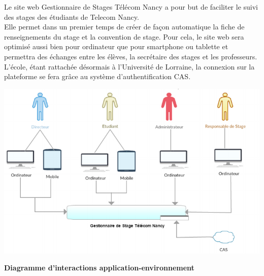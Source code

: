 \documentclass{scrreprt}
\begin{document}
\hspace{1cm}Le site web Gestionnaire de Stages Télécom Nancy a pour but de faciliter le suivi des stages des étudiants de Telecom Nancy.\\

\hspace{0.6cm}Elle permet dans un premier temps de créer de façon automatique la fiche de renseignements du stage et la convention de stage. Pour cela, le site web sera optimisé aussi bien pour ordinateur que pour smartphone ou tablette et permettra des échanges entre les élèves, la secrétaire des stages et les professeurs. L'école, étant rattachée désormais à l'Université de Lorraine, la connexion sur la plateforme se fera grâce au système d'authentification CAS.

\begin{center}
\centerline{\includegraphics[scale=0.65]{image/perspectivedeproduit.png}}
\end{center}

\begin{center}
\textbf{Diagramme d'interactions application-environnement}
\end{center}

\vspace{1cm}
\end{document}
